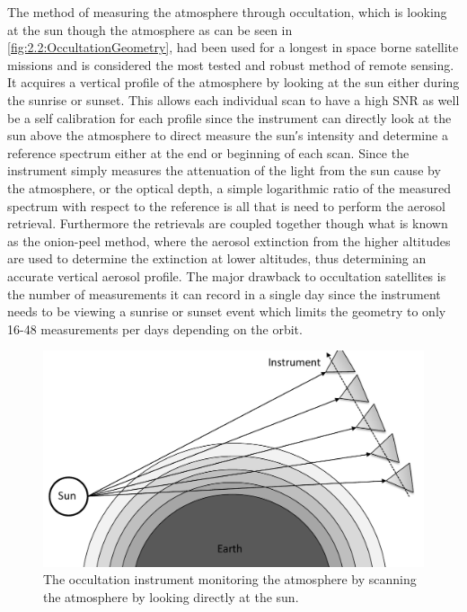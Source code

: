 The method of measuring the atmosphere through occultation, which is looking at the sun though the atmosphere as can be seen in \autoref{fig:2.2:OccultationGeometry}, had been used for a longest in space borne satellite missions and is considered the most tested and robust method of remote sensing. It acquires a vertical profile of the atmosphere by looking at the sun either during the sunrise or sunset. This allows each individual scan to have a high SNR as well be a self calibration for each profile since the instrument can directly look at the sun above the atmosphere to direct measure the sun\si{\arcminute}s intensity and determine a reference spectrum either at the end or beginning of each scan. Since the instrument simply measures the attenuation of the light from the sun cause by the atmosphere, or the optical depth, a simple logarithmic ratio of the measured spectrum with respect to the reference is all that is need to perform the aerosol retrieval. Furthermore the retrievals are coupled together though what is known as the onion-peel method, where the aerosol extinction from the higher altitudes are used to determine the extinction at lower altitudes, thus determining an accurate vertical aerosol profile. The major drawback to occultation satellites is the number of measurements it can record in a single day since the instrument needs to be viewing a sunrise or sunset event which limits the geometry to only 16-48 measurements per days depending on the orbit.

\begin{figure}[h!]
    \includegraphics[width=1.0\textwidth]{./Images/2-2-OccultationGeometry.pdf}
    \caption[Occultation Geometry]{The occultation instrument monitoring the atmosphere by scanning the atmosphere by looking directly at the sun.}
    \label{fig:2.2:OccultationGeometry}
\end{figure}

